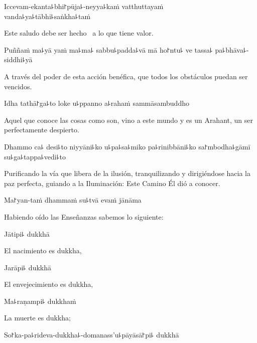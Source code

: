 Iccevam-ekanta꜕bhi꜓pūja꜕-neyya꜕kaṁ vatthuttayaṁ \\vanda꜕ya꜕tābhi꜕saṅkha꜕taṁ

\begin{english}
 Este saludo debe ser hecho \pause\ a lo que tiene valor.
\end{english}

Puññaṁ ma꜕yā yaṁ ma꜕ma꜕ sabbu꜕padda꜕vā mā ho꜓ntu꜕ ve tassa꜕ pa꜕bhāva꜕-siddhi꜕yā

\begin{english}
  A través del poder de esta acción benéfica, que todos los obstáculos puedan ser vencidos.
\end{english}

Idha tathā꜓ga꜕to loke u꜕ppanno a꜕rahaṁ sammāsambuddho

\begin{english}
  Aquel que conoce las cosas como son, vino a este mundo y es un Arahant, un ser perfectamente despierto.
\end{english}

Dhammo ca꜕ desi꜕to niyyāni꜕ko u꜕pa꜕sa꜕miko pa꜕rinibbāni꜕ko sa꜓mbodha꜕gāmī su꜕ga꜕tappa꜕vedi꜕to

\enlargethispage{\baselineskip}

\begin{english}
  Purificando la vía que libera de la ilusión, tranquilizando y dirigiéndose hacia la paz perfecta, guiando a la Iluminación: Este Camino Él dió a conocer.
\end{english}

Ma꜓yan-taṁ dhammaṁ su꜕tvā evaṁ jānāma

\begin{english}
  Habiendo oído las Enseñanzas sabemos lo siguiente:
\end{english}

Jātipi꜕ dukkhā

\begin{english}
  El nacimiento es dukkha,
\end{english}

Jarāpi꜕ dukkhā

\begin{english}
  El envejecimiento es dukkha,
\end{english}

Ma꜕raṇampi꜕ dukkhaṁ

\begin{english}
  La muerte es dukkha;
\end{english}

So꜓ka-pa꜕rideva-dukkha꜕-domanass'u꜕pāyāsā꜓pi꜕ dukkhā


